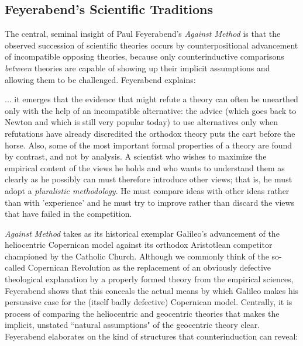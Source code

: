 \subsection{Feyerabend's Scientific Traditions}
\label{traditions}
The central, seminal insight of Paul Feyerabend's \textit{Against Method} is that the observed succession of scientific theories occurs by counterpositional advancement of incompatible opposing theories, because only counterinductive comparisons \textit{between} theories are capable of showing up their implicit assumptions and allowing them to be challenged. Feyerabend explains:

\begin{longquote}

... it emerges that the evidence that might refute a
theory can often be unearthed only with the help of an incompatible
alternative: the advice (which goes back to Newton and which is still
very popular today) to use alternatives only when refutations have
already discredited the orthodox theory puts the cart before the
horse. Also, some of the most important formal properties of a theory
are found by contrast, and not by analysis. A scientist who wishes to
maximize the empirical content of the views he holds and who wants
to understand them as clearly as he possibly can must therefore
introduce other views; that is, he must adopt a \textit{pluralistic methodology}.
He must compare ideas with other ideas rather than with
'experience' and he must try to improve rather than discard the views
that have failed in the competition.\cite[p.20]{Feyerabend1993}

\end{longquote}

\textit{Against Method} takes as its historical exemplar Galileo's advancement of the heliocentric Copernican model against its orthodox Aristotlean competitor championed by the Catholic Church. Although we commonly think of the so-called Copernican Revolution as the replacement of an obviously defective theological explanation by a properly formed theory from the empirical sciences, Feyerabend shows that this conceals the actual means by which Galileo makes his persuasive case for the (itself badly defective) Copernican model. Centrally, it is process of comparing the heliocentric and geocentric theories that makes the implicit, unstated ``natural assumptions" of the geocentric theory clear. Feyerabend elaborates on the kind of structures that counterinduction can reveal:

